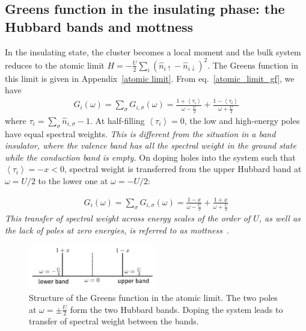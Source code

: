 \documentclass{report}
\numberwithin{equation}{section}
\begin{document}
\subsection{Greens function in the insulating phase: the Hubbard bands and mottness}
In the insulating state, the cluster becomes a local moment and the bulk system reduces to the atomic limit \(H = -\frac{U}{2}\sum_i\left(\hat n_{i \uparrow} - \hat n_{i \downarrow}\right)^2\). The Greens function in this limit is given in Appendix~\ref{atomic limit}. From eq.~\ref{atomic_limit_gf}, we have
\begin{equation}\begin{aligned}
	G_{i}(\omega) = \sum_\sigma G_{i,\sigma}(\omega) = \frac{1 + \left<\tau_{i }\right>}{\omega - \frac{U}{2}} + \frac{1 - \left<\tau_{i}\right>}{\omega + \frac{U}{2}}
\end{aligned}\end{equation}
where \(\tau_i = \sum_\sigma \hat n_{i,\sigma} - 1\). At half-filling \(\left<\tau_{i}\right>=0\), the low and high-energy poles have equal spectral weights. \textit{This is different from the situation in a band insulator, where the valence band has all the spectral weight in the ground state while the conduction band is empty.} On doping holes into the system such that \(\left<\tau_{i}\right> = -x < 0\), spectral weight is transferred from the upper Hubbard band at \(\omega = U/2\) to the lower one at \(\omega = -U/2\):

\begin{equation}\begin{aligned}
	G_{i}(\omega) = \sum_\sigma G_{i,\sigma}(\omega) = \frac{1 - x}{\omega - \frac{U}{2}} + \frac{1 + x}{\omega + \frac{U}{2}}
\end{aligned}\end{equation}
\textit{This transfer of spectral weight across energy scales of the order of \(U\), as well as the lack of poles at zero energies, is referred to as mottness}~\cite{phillips2006mottness}.
\begin{figure}[!htb]
	\centering
	\includegraphics[width=0.5\textwidth]{../figures/hubbard_bands.pdf}
	\caption{Structure of the Greens function in the atomic limit. The two poles at \(\omega = \pm \frac{U}{2}\) form the two Hubbard bands. Doping the system leads to transfer of spectral weight between the bands.}
\end{figure}
\end{document}
